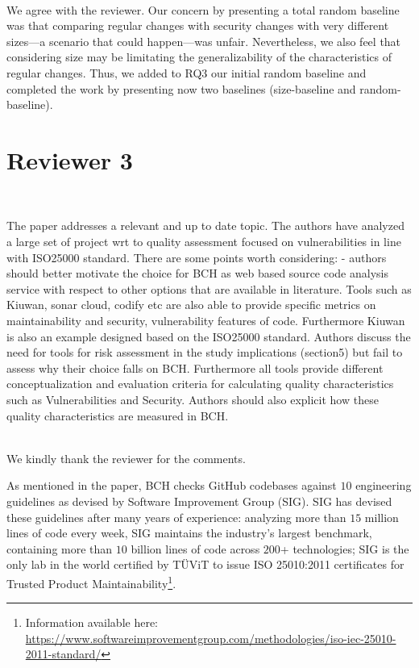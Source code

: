 \documentclass[11pt,fleqn]{article}
\newcommand{\eline}{\vspace*{.75\baselineskip}}
\newcommand{\Referee}[1]{\eline \noindent {\bf Reviewer comment #1:} \\}
\newcommand{\Us}{\eline \noindent {\bf Response:}\\}
\newcommand{\newreviewer}[1]{\section*{Reviewer #1}\vspace*{-1.05\baselineskip}}
\newenvironment{revcomment}[1][]
{\Referee{#1}\begin{rcomment}}
{\end{rcomment}}
\begin{document}
\Us We agree with the reviewer. Our concern by presenting a total random baseline 
was that 
comparing regular changes with security changes with very different sizes---a scenario 
that could happen---was unfair. 
Nevertheless, we also feel that considering size may be limitating the generalizability
of the characteristics of regular changes. Thus, we added to RQ3 our initial random 
baseline and completed the work by presenting now two baselines (size-baseline and random-baseline). 

\pagebreak

\newreviewer{3}

\begin{revcomment}[3.1]

    The paper addresses a relevant and up to date topic. 
    The authors have analyzed a large set of project wrt to 
    quality assessment focused on vulnerabilities in line with 
    ISO25000 standard. There are some points worth considering: 
    - authors should better motivate the choice for BCH as web 
    based source code analysis service with respect to other 
    options that are available in literature. Tools such as Kiuwan, 
    sonar cloud, codify etc are also able to provide specific metrics 
    on maintainability and security, vulnerability features of code. 
    Furthermore Kiuwan is also an example designed based on the ISO25000 
    standard. Authors discuss the need for tools for risk assessment in 
    the study implications (section5) but fail to assess why their choice 
    falls on BCH. Furthermore all tools provide different conceptualization 
    and evaluation criteria for calculating quality characteristics such as Vulnerabilities 
    and Security. Authors should also explicit how these quality characteristics are measured in BCH. 

\end{revcomment}

\Us We kindly thank the reviewer for the comments. 

As mentioned in the paper, BCH checks GitHub codebases against $10$ engineering 
guidelines as devised by Software Improvement Group (SIG). SIG has devised 
these guidelines after many years of experience: analyzing more than $15$ million 
lines of code every week, SIG maintains the industry’s largest 
benchmark, containing more than $10$ billion lines of code across $200$+ 
technologies; SIG is the only lab in the world certified by TÜViT to issue ISO 25010:2011
certificates for Trusted Product Maintainability\footnote{Information available here: 
\url{https://www.softwareimprovementgroup.com/methodologies/iso-iec-25010-2011-standard/}}.
\end{document}
